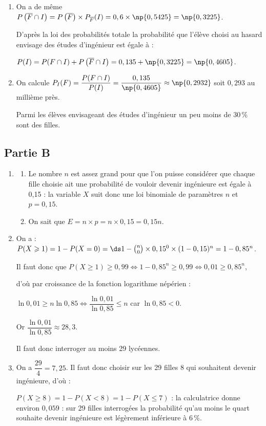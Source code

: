 \begin{enumerate}
	\item On a de même $P\left(\overline{F} \cap I\right)=  P\left(\overline{F}\right) \times P_{\overline{F}}(I) = 0,6 \times \np{0,5425} = \np{0,3225}$.

	D'après la loi des probabilités totale la probabilité que l'élève choisi au hasard envisage des études d'ingénieur est égale à :

	$P(I) = P(F \cap I) + P\left(\overline{F} \cap I\right) = 0,135 + \np{0,3225} = \np{0,4605}$.

	\item On calcule $P_I(F) = \dfrac{P(F \cap I)}{P(I)} = \dfrac{0,135}{\np{0,4605}} \approx \np{0,2932}$ soit $0,293$ au millième près.

	Parmi les élèves envisageant des études d'ingénieur un peu moins de 30\,\% sont des filles.
\end{enumerate}

\subsection*{Partie B}
\begin{enumerate} \item
	\begin{enumerate}
		\item Le nombre $n$ est assez grand pour que l'on puisse considérer que chaque fille choisie ait une probabilité de vouloir devenir ingénieure est égale à 0,15 : la variable $X$ suit donc une loi binomiale de paramètres $n$ et $p = 0,15$.

		\item On sait que $E  = n \times p = n \times 0,15 = 0,15n$.
	\end{enumerate}
	\item On a : $P(X \geqslant 1) = 1 - P(X = 0) =\ds 1 - \binom{n}{0} \times 0,15^0 \times (1 - 0,15)^n = 1 - 0,85^n$.

	Il faut donc que $P(X \geqslant 1) \geqslant 0,99 \iff 1 - 0,85^n \geqslant 0,99 \iff 0,01 \geqslant 0,85^n$,

	d'où par croissance de la fonction logarithme népérien :

	$\ln 0,01 \geqslant n\ln 0,85 \iff \dfrac{\ln 0,01}{\ln 0,85} \leqslant n$ car $\ln 0,85 < 0$.

	Or $\dfrac{\ln 0,01}{\ln 0,85} \approx 28,3$.

	Il faut donc interroger au moins 29 lycéennes.

	\item On a $\dfrac{29}{4} = 7,25$. Il faut donc choisir sur les 29 filles 8 qui souhaitent devenir ingénieure, d'où :

	$P(X\geqslant 8) = 1 - P(X < 8) = 1 - P(X \leqslant 7)
	$ : la calculatrice donne environ $0,059$ : sur 29 filles interrogées la probabilité qu'au moins le quart souhaite devenir ingénieure est légèrement inférieure à 6\,\%.
\end{enumerate}

